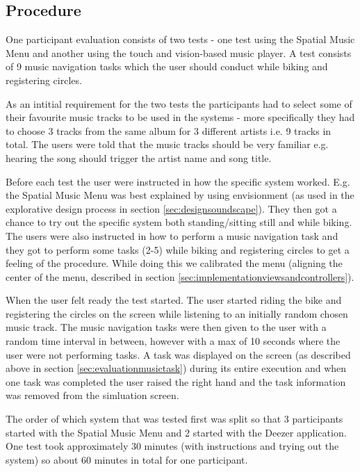 \subsection{Procedure}
One participant evaluation consists of two tests - one test using the Spatial Music Menu and another using the touch and vision-based music player. A test consists of 9 music navigation tasks which the user should conduct while biking and registering circles.

As an intitial requirement for the two tests the participants had to select some of their favourite music tracks to be used in the systems - more specifically they had to choose 3 tracks from the same album for 3 different artists i.e. 9 tracks in total. The users were told that the music tracks should be very familiar e.g. hearing the song should trigger the artist name and song title.

Before each test the user were instructed in how the specific system worked. E.g. the Spatial Music Menu was best explained by using envisionment (as used in the explorative design process in section \ref{sec:designsoundscape}). They then got a chance to try out the specific system both standing/sitting still and while biking. The users were also instructed in how to perform a music navigation task and they got to perform some tasks (2-5) while biking and registering circles to get a feeling of the procedure. While doing this we calibrated the menu (aligning the center of the menu, described in section \ref{sec:implementationviewsandcontrollers}).

When the user felt ready the test started. The user started riding the bike and registering the circles on the screen while listening to an initially random chosen music track. The music navigation tasks were then given to the user with a random time interval in between, however with a max of 10 seconds where the user were not performing tasks. A task was displayed on the screen (as described above in section \ref{sec:evaluationmusictask}) during its entire execution and when one task was completed the user raised the right hand and the task information was removed from the simluation screen.

The order of which system that was tested first was split so that 3 participants started with the Spatial Music Menu and 2 started with the Deezer application. One test took approximately 30 minutes (with instructions and trying out the system) so about 60 minutes in total for one participant.


